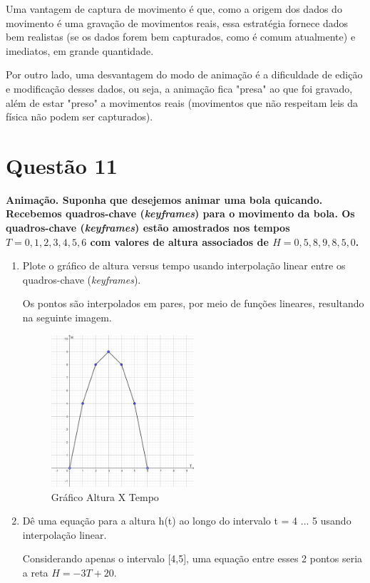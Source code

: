 \documentclass[12pt]{exam}
\begin{document}
Uma vantagem de captura de movimento é que, como a origem dos dados do movimento é uma gravação de movimentos reais, essa estratégia fornece dados bem realistas (se os dados forem bem capturados, como é comum atualmente) e imediatos, em grande quantidade.

Por outro lado, uma desvantagem do modo de animação é a dificuldade de edição e modificação desses dados, ou seja, a animação fica "presa" ao que foi gravado, além de estar "preso" a movimentos reais (movimentos que não respeitam leis da física não podem ser capturados).

\section*{Questão 11}
{\bfseries Animação. Suponha que desejemos animar uma bola quicando. Recebemos quadros-chave (\textit{keyframes}) para o movimento da bola. Os quadros-chave (\textit{keyframes}) estão amostrados nos tempos $T = 0, 1, 2, 3, 4, 5, 6$ com valores de altura associados de $H = 0, 5, 8, 9, 8, 5, 0$.}

\begin{enumerate}[label=\alph*)]
    \item Plote o gráfico de altura versus tempo usando interpolação linear entre os quadros-chave (\textit{keyframes}).
    
    Os pontos são interpolados em pares, por meio de funções lineares, resultando na seguinte imagem.
    
    \begin{figure}[ht]
        \centering
        \includegraphics[width=0.5\textwidth]{images/fit.png}
        \caption{Gráfico Altura X Tempo}
        \label{fig:11a}
    \end{figure}
    
    \item Dê uma equação para a altura h(t) ao longo do intervalo t = 4 ... 5 usando interpolação linear.
    
    Considerando apenas o intervalo [4,5], uma equação entre esses 2 pontos seria a reta $H = -3T+20$.
\end{enumerate}
\end{document}
